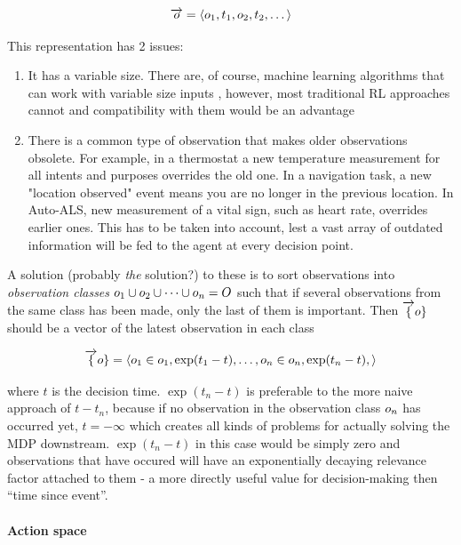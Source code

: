 \begin{equation} 
\overrightarrow{o} = \langle o_1, t_1, o_2, t_2, \dots \rangle 
\end{equation}

This representation has 2 issues: 
\begin{enumerate}
    \item It has a variable size. There are, of course, machine learning algorithms that can work with variable size inputs \cite{hochreiterLongShorttermMemory1997}, however, most traditional RL approaches cannot and compatibility with them would be an advantage
    \item There is a common type of observation that makes older observations obsolete. For example, in a thermostat a new temperature measurement for all intents and purposes overrides the old one. In a navigation task, a new "location observed" event means you are no longer in the previous location. In Auto-ALS, new measurement of a vital sign, such as heart rate, overrides earlier ones. This has to be taken into account, lest a vast array of outdated information will be fed to the agent at every decision point.
\end{enumerate}

A solution (probably \emph{the} solution?) to these is to sort observations into \emph{observation classes} $o_1 \cup o_2 \cup \dots
\cup o_n = O$ such that if several observations from the same class has been made, only the last of them is important. Then $\overrightarrow\{o\}$ should
be a vector of the latest observation in each class

\begin{equation} \overrightarrow\{o\} =
\langle o_1 \in o_1,
\exp(t_1-t), \dots, o_n \in
o_n, \exp(t_n-t), \rangle
\end{equation}

where $t$ is the decision time.
$\exp(t_n-t)$ is preferable
to the more naive approach of $t-t_n$,
because if no observation in the observation class
$o_n$ has occurred yet,
$t=-\infty$ which creates all
kinds of problems for actually solving the MDP downstream.
$\exp(t_n-t)$ in this case
would be simply zero and observations that have occured will have an
exponentially decaying relevance factor attached to them - a more
directly useful value for decision-making then ``time since event''.

\paragraph{Action space}

